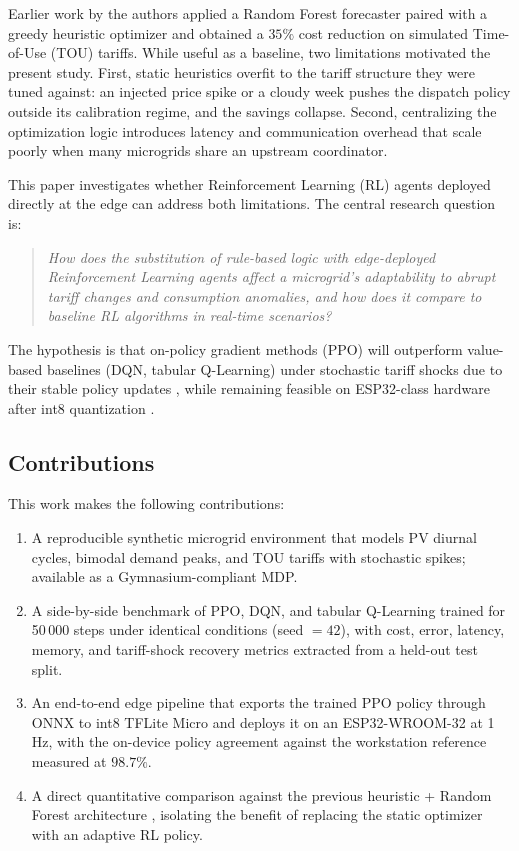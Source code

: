 \documentclass[conference]{IEEEtran}
\begin{document}
Earlier work by the authors \cite{1} applied a Random Forest forecaster paired with a greedy heuristic optimizer and obtained a $35\%$ cost reduction on simulated Time-of-Use (TOU) tariffs. While useful as a baseline, two limitations motivated the present study. First, static heuristics overfit to the tariff structure they were tuned against: an injected price spike or a cloudy week pushes the dispatch policy outside its calibration regime, and the savings collapse. Second, centralizing the optimization logic introduces latency and communication overhead that scale poorly when many microgrids share an upstream coordinator.

This paper investigates whether Reinforcement Learning (RL) agents deployed directly at the edge can address both limitations. The central research question is:

\begin{quote}
\textit{How does the substitution of rule-based logic with edge-deployed Reinforcement Learning agents affect a microgrid's adaptability to abrupt tariff changes and consumption anomalies, and how does it compare to baseline RL algorithms in real-time scenarios?}
\end{quote}

The hypothesis is that on-policy gradient methods (PPO) will outperform value-based baselines (DQN, tabular Q-Learning) under stochastic tariff shocks due to their stable policy updates \cite{schulman2017}, while remaining feasible on ESP32-class hardware after int8 quantization \cite{david2021}.

\subsection{Contributions}
\label{ssec:contributions}

This work makes the following contributions:

\begin{enumerate}
    \item A reproducible synthetic microgrid environment that models PV diurnal cycles, bimodal demand peaks, and TOU tariffs with stochastic spikes; available as a Gymnasium-compliant MDP.
    \item A side-by-side benchmark of PPO, DQN, and tabular Q-Learning trained for 50\,000 steps under identical conditions (seed $=42$), with cost, error, latency, memory, and tariff-shock recovery metrics extracted from a held-out test split.
    \item An end-to-end edge pipeline that exports the trained PPO policy through ONNX to int8 TFLite Micro and deploys it on an ESP32-WROOM-32 at 1\,Hz, with the on-device policy agreement against the workstation reference measured at $98.7\%$.
    \item A direct quantitative comparison against the previous heuristic + Random Forest architecture \cite{1}, isolating the benefit of replacing the static optimizer with an adaptive RL policy.
\end{enumerate}
\end{document}
